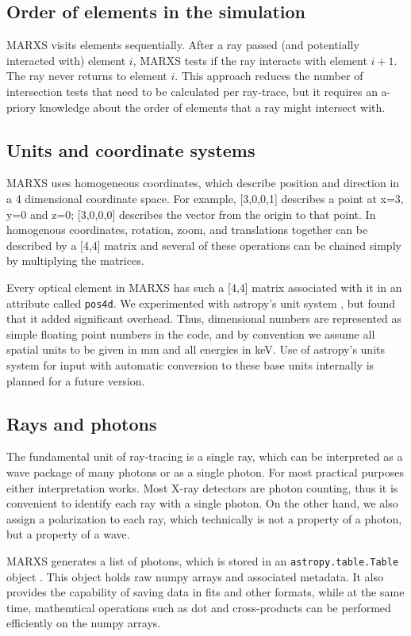\documentclass[twocolumn]{aastex61}
\begin{document}
\subsection{Order of elements in the simulation}
MARXS visits elements sequentially. After a ray passed (and potentially
interacted with) element $i$, MARXS tests if the ray interacts with element
$i+1$. The ray never returns to element $i$. This approach reduces the number
of intersection tests that need to be calculated per ray-trace, but it requires
an a-priory knowledge about the order of elements that a ray might intersect
with.

\subsection{Units and coordinate systems}
MARXS uses homogeneous coordinates, which describe position and direction in a
4 dimensional coordinate space. For example, [3,0,0,1] describes a point at
x=3, y=0 and z=0; [3,0,0,0] describes the vector from the origin to that
point. In homogenous coordinates, rotation, zoom, and translations together can
be described by a [4,4] matrix and several of these operations can be chained
simply by multiplying the matrices.

Every optical element in MARXS has such a [4,4] matrix associated with it in an
attribute called \texttt{pos4d}. We experimented with astropy's unit system
\citep{2013A&A...558A..33A}, but found that it added significant
overhead. Thus, dimensional numbers are represented as simple floating point
numbers in the code, and by convention we assume all spatial units to be given
in mm and all energies in keV. Use of astropy's units system for input with
automatic conversion to these base units internally is planned for a future
version.

\subsection{Rays and photons}
The fundamental unit of ray-tracing is a single ray, which can be interpreted
as a wave package of many photons or as a single photon. For most practical
purposes either interpretation works. Most X-ray detectors are photon counting,
thus it is convenient to identify each ray with a single photon. On the other
hand, we also assign a polarization to each ray, which technically is not a
property of a photon, but a property of a wave.

MARXS generates a list of photons, which is stored in an
\texttt{astropy.table.Table} object \citep{2013A&A...558A..33A}. This object
holds raw numpy arrays and associated metadata. It also provides the capability
of saving data in fits and other formats, while at the same time, mathemtical
operations such as dot and cross-products can be performed efficiently on the
numpy arrays.
\end{document}
